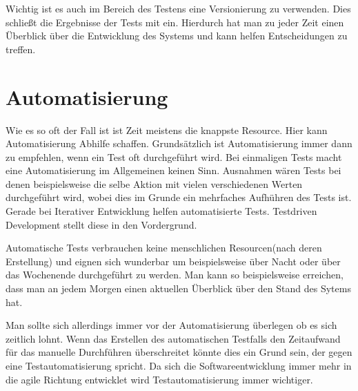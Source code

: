 Wichtig ist es auch im Bereich des Testens eine Versionierung zu verwenden. Dies schlie\ss{}t die Ergebnisse der Tests mit ein. Hierdurch hat man zu jeder Zeit einen \"Uberblick \"uber die Entwicklung des Systems und kann helfen Entscheidungen zu treffen.

\section{Automatisierung}
Wie es so oft der Fall ist ist Zeit meistens die knappste Resource. Hier kann Automatisierung Abhilfe schaffen. Grunds\"atzlich ist Automatisierung immer dann zu empfehlen, wenn ein Test oft durchgef\"uhrt wird. Bei einmaligen Tests macht eine Automatisierung im Allgemeinen keinen Sinn. Ausnahmen w\"aren Tests bei denen beispielsweise die selbe Aktion mit vielen verschiedenen Werten durchgef\"uhrt wird, wobei dies im Grunde ein mehrfaches Aufh\"uhren des Tests ist. Gerade bei Iterativer Entwicklung helfen automatisierte Tests. Testdriven Development stellt diese in den Vordergrund.

Automatische Tests verbrauchen keine menschlichen Resourcen(nach deren Erstellung) und eignen sich wunderbar um beispielsweise \"uber Nacht oder \"uber das Wochenende durchgef\"uhrt zu werden. Man kann so beispielsweise erreichen, dass man an jedem Morgen einen aktuellen \"Uberblick \"uber den Stand des Sytems hat.

Man sollte sich allerdings immer vor der Automatisierung \"uberlegen ob es sich zeitlich lohnt. Wenn das Erstellen des automatischen Testfalls den Zeitaufwand f\"ur das manuelle Durchf\"uhren \"uberschreitet k\"onnte dies ein Grund sein, der gegen eine Testautomatisierung spricht. Da sich die Softwareentwicklung immer mehr in die agile Richtung entwicklet wird Testautomatisierung immer wichtiger.
